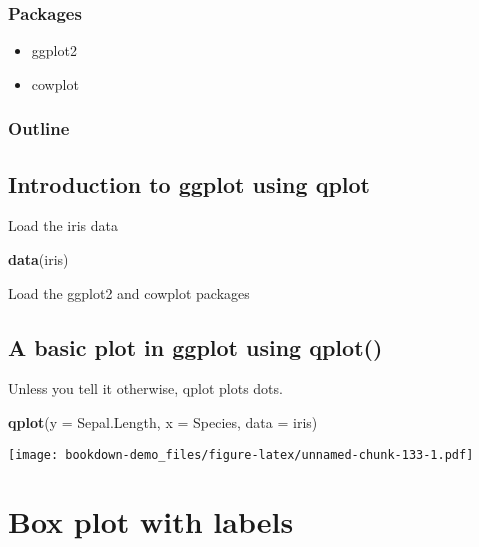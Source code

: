 \documentclass[]{book}
\newenvironment{Shaded}{\begin{snugshade}}{\end{snugshade}}
\newcommand{\KeywordTok}[1]{\textcolor[rgb]{0.13,0.29,0.53}{\textbf{#1}}}
\newcommand{\DataTypeTok}[1]{\textcolor[rgb]{0.13,0.29,0.53}{#1}}
\newcommand{\NormalTok}[1]{#1}
\providecommand{\tightlist}{%
  \setlength{\itemsep}{0pt}\setlength{\parskip}{0pt}}
\theoremstyle{definition}
\theoremstyle{definition}
\theoremstyle{definition}
\theoremstyle{remark}
\begin{document}
\subsection{Packages}\label{packages-5}

\begin{itemize}
\tightlist
\item
  ggplot2
\item
  cowplot
\end{itemize}

\subsection{Outline}\label{outline-1}

\section{Introduction to ggplot using
qplot}\label{introduction-to-ggplot-using-qplot}

Load the iris data

\begin{Shaded}
\begin{Highlighting}[]
\KeywordTok{data}\NormalTok{(iris)}
\end{Highlighting}
\end{Shaded}

Load the ggplot2 and cowplot packages

\section{A basic plot in ggplot using
qplot()}\label{a-basic-plot-in-ggplot-using-qplot}

Unless you tell it otherwise, qplot plots dots.

\begin{Shaded}
\begin{Highlighting}[]
\KeywordTok{qplot}\NormalTok{(}\DataTypeTok{y =}\NormalTok{ Sepal.Length,}
      \DataTypeTok{x =}\NormalTok{ Species,    }
        \DataTypeTok{data =}\NormalTok{ iris) }
\end{Highlighting}
\end{Shaded}

\texttt{[image: bookdown-demo\_files/figure-latex/unnamed-chunk-133-1.pdf]}

\chapter{Box plot with labels}\label{box-plot-with-labels}
\end{document}
